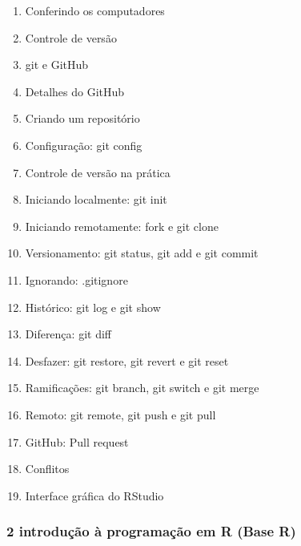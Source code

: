 \documentclass[
  letterpaper,
  DIV=11,
  numbers=noendperiod]{scrartcl}
\providecommand{\tightlist}{%
  \setlength{\itemsep}{0pt}\setlength{\parskip}{0pt}}\usepackage{longtable,booktabs,array}
\begin{document}
\begin{enumerate}
\def\labelenumi{\arabic{enumi}.}
\tightlist
\item
  Conferindo os computadores
\item
  Controle de versão
\item
  git e GitHub
\item
  Detalhes do GitHub
\item
  Criando um repositório
\item
  Configuração: git config
\item
  Controle de versão na prática
\item
  Iniciando localmente: git init
\item
  Iniciando remotamente: fork e git clone
\item
  Versionamento: git status, git add e git commit
\item
  Ignorando: .gitignore
\item
  Histórico: git log e git show
\item
  Diferença: git diff
\item
  Desfazer: git restore, git revert e git reset
\item
  Ramificações: git branch, git switch e git merge
\item
  Remoto: git remote, git push e git pull
\item
  GitHub: Pull request
\item
  Conflitos
\item
  Interface gráfica do RStudio
\end{enumerate}

\subsubsection{2 introdução à programação em R (Base
R)}\label{introduuxe7uxe3o-uxe0-programauxe7uxe3o-em-r-base-r}
\end{document}
